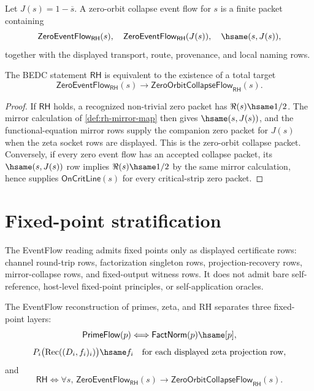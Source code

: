 \begin{definition}
\label{def:rh-zero-orbit-collapse-event-flow}
Let $J(s)=1-\overline{s}$.  A zero-orbit collapse event flow for $s$ is a
finite packet containing
$$
\mathsf{ZeroEventFlow}_{\mathsf{RH}}(s),\quad
\mathsf{ZeroEventFlow}_{\mathsf{RH}}(J(s)),\quad
\hsame(s,J(s)),
$$
together with the displayed transport, route, provenance, and local naming
rows.
\end{definition}

\begin{proposition}
\label{prop:rh-is-zero-orbit-collapse}
The BEDC statement $\mathsf{RH}$ is equivalent to the existence of a total
target
$$
\mathsf{ZeroEventFlow}_{\mathsf{RH}}(s)
\to
\mathsf{ZeroOrbitCollapseFlow}_{\mathsf{RH}}(s).
$$
\end{proposition}

\begin{proof}
If $\mathsf{RH}$ holds, a recognized non-trivial zero packet has
$\Re(s)\hsame 1/2$.  The mirror calculation of \autoref{def:rh-mirror-map}
then gives $\hsame(s,J(s))$, and the functional-equation mirror rows supply
the companion zero packet for $J(s)$ when the zeta socket rows are displayed.
This is the zero-orbit collapse packet.  Conversely, if every zero event flow
has an accepted collapse packet, its $\hsame(s,J(s))$ row implies
$\Re(s)\hsame 1/2$ by the same mirror calculation, hence supplies
$\mathsf{OnCritLine}(s)$ for every critical-strip zero packet.
\end{proof}

\section{Fixed-point stratification}
\label{sec:rh-fixed-point-stratification}

\begin{principle}
\label{prin:rh-certified-fixed-points-only}
The EventFlow reading admits fixed points only as displayed certificate rows:
channel round-trip rows, factorization singleton rows, projection-recovery
rows, mirror-collapse rows, and fixed-output witness rows.  It does not admit
bare self-reference, host-level fixed-point principles, or self-application
oracles.
\end{principle}

\begin{theorem}
\label{thm:rh-three-fixed-point-layers}
The EventFlow reconstruction of primes, zeta, and RH separates three
fixed-point layers:
$$
\mathsf{PrimeFlow}(p)
\Longleftrightarrow
\mathsf{FactNorm}(p)\hsame[p],
$$
$$
P_i\bigl(\operatorname{Rec}((D_i,f_i)_i)\bigr)\hsame f_i
\quad\text{for each displayed zeta projection row},
$$
and
$$
\mathsf{RH}
\Longleftrightarrow
\forall s,\,
\mathsf{ZeroEventFlow}_{\mathsf{RH}}(s)
\to
\mathsf{ZeroOrbitCollapseFlow}_{\mathsf{RH}}(s).
$$
\end{theorem}

